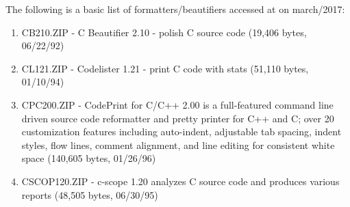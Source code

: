 The following is a basic list of formatters/beautifiers accessed at
 on march/2017:

\medskip
\begin{sloppypar}
\begin{bluebox}\RaggedRight
\begin{enumerate}[leftmargin=*,parsep=0pt]

    \item CB210.ZIP - C Beautifier 2.10 - polish C source code (19,406 bytes, 06/22/92)
    \item CL121.ZIP - Codelister 1.21 - print C code with stats (51,110 bytes, 01/10/94)

    \item CPC200.ZIP - CodePrint for C/C++ 2.00 is a full-featured command line driven source
    code reformatter and pretty printer for C++ and C; over 20 customization features including
    auto-indent, adjustable tab spacing, indent styles, flow lines, comment alignment, and line
    editing for consistent white space (140,605 bytes, 01/26/96)

    \item CSCOP120.ZIP - c-scope 1.20 analyzes C source code and produces various reports
    (48,505 bytes, 06/30/95)


\end{enumerate}
\end{bluebox}
\end{sloppypar}
